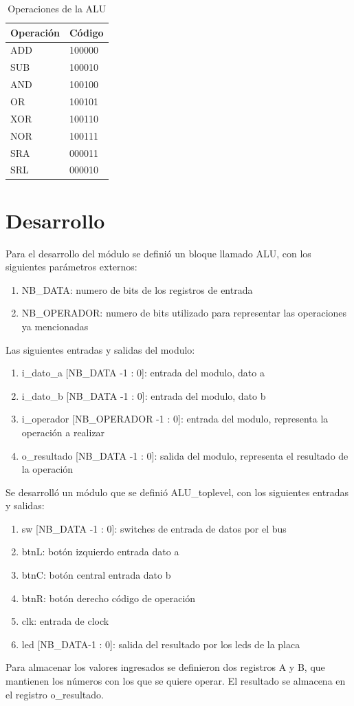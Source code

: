 \documentclass[a4paper]{article}
\begin{document}
\begin{table}[h]
\centering
\begin{tabular}{@{}ll@{}}
\toprule
Operación & Código \\ \midrule
ADD       & 100000 \\
SUB       & 100010 \\
AND       & 100100 \\
OR        & 100101 \\
XOR       & 100110 \\
NOR       & 100111 \\ 
SRA       & 000011 \\
SRL       & 000010 \\ \bottomrule
\end{tabular}
\caption{Operaciones de la ALU}
\label{operaciones}
\end{table}

\section{Desarrollo}

Para el desarrollo del módulo se definió un bloque llamado ALU, con los siguientes parámetros externos:
\begin{enumerate}
    \item NB\_DATA: numero de bits de los registros de entrada
    \item NB\_OPERADOR: numero de bits utilizado para representar las operaciones ya mencionadas
\end{enumerate}
Las siguientes entradas y salidas del modulo:
\begin{enumerate}
    \item i\_dato\_a [NB\_DATA -1 : 0]: entrada del modulo, dato a
    \item i\_dato\_b [NB\_DATA -1 : 0]: entrada del modulo, dato b
    \item i\_operador [NB\_OPERADOR -1 : 0]: entrada del modulo, representa la operación a realizar
    \item o\_resultado [NB\_DATA -1 : 0]: salida del modulo, representa el resultado de la operación
\end{enumerate}
Se desarrolló un módulo que se definió ALU\_toplevel, con los siguientes entradas y salidas:
\begin{enumerate}
    \item sw [NB\_DATA -1 : 0]: switches de entrada de datos por el bus
    \item btnL: botón izquierdo entrada dato a
    \item btnC: botón central entrada dato b
    \item btnR: botón derecho código de operación
    \item clk: entrada de clock
    \item led [NB\_DATA-1 : 0]: salida del resultado por los leds de la placa
\end{enumerate}
Para almacenar los valores ingresados se definieron dos registros A y B, que mantienen los números con los que se quiere operar. 
El resultado se almacena en el registro o\_resultado.\\
\end{document}

